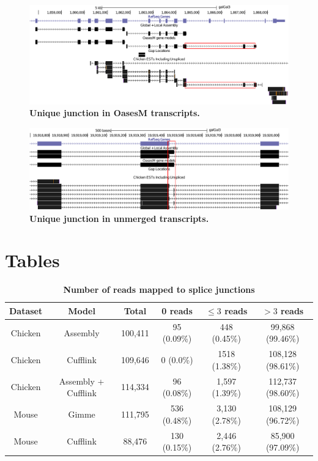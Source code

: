 \documentclass[10pt]{article}
\begin{document}
\begin{figure}[!ht]
\begin{center}
\includegraphics[width=6in]{uniq_junc_oasesM.pdf}
\end{center}
\caption{
{\bf Unique junction in OasesM transcripts.}
}
\label{uniq_junc_oasesM}
\end{figure}

\begin{figure}[!ht]
\begin{center}
\includegraphics[width=6in]{uniq_junc_unmerged.pdf}
\end{center}
\caption{
{\bf Unique junction in unmerged transcripts.}
}
\label{uniq_junc_unmerged}
\end{figure}

\section*{Tables}
\begin{table}[!ht]
\caption{
\bf{Number of reads mapped to splice junctions}}
\begin{tabular}{cccccc}
\hline
Dataset & Model & Total & 0 reads& $\le3$ reads & $>3$ reads \\ 
\hline
Chicken & Assembly & 100,411 & 95 (0.09\%) & 448 (0.45\%) & 99,868 (99.46\%) \\
Chicken & Cufflink & 109,646 & 0 (0.0\%) & 1518 (1.38\%) & 108,128 (98.61\%) \\
Chicken & Assembly + Cufflink & 114,334 & 96 (0.08\%) & 1,597 (1.39\%) & 112,737 (98.60\%) \\
Mouse & Gimme & 111,795 & 536 (0.48\%) & 3,130 (2.78\%) & 108,129 (96.72\%) \\
Mouse & Cufflink & 88,476 & 130 (0.15\%) & 2,446 (2.76\%) & 85,900 (97.09\%) \\
\hline
\end{tabular}
\label{junction_read}

\end{table}
\end{document}
